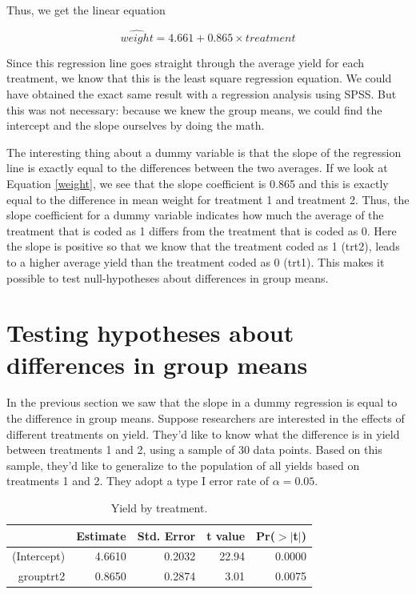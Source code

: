 \documentclass[]{book}\usepackage[]{graphicx}\usepackage[]{color}
\begin{document}
Thus, we get the linear equation 

\begin{equation}
\label{weight}
\widehat{weight} = 4.661 + 0.865\times treatment
\end{equation}

Since this regression line goes straight through the average yield for each treatment, we know that this is the least square regression equation. We could have obtained the exact same result with a regression analysis using SPSS. But this was not necessary: because we knew the group means, we could find the intercept and the slope ourselves by doing the math.  

The interesting thing about a dummy variable is that the slope of the regression line is exactly equal to the differences between the two averages. If we look at Equation \ref{weight}, we see that the slope coefficient is 0.865 and this is exactly equal to the difference in mean weight for treatment 1 and treatment 2. Thus, the slope coefficient for a dummy variable indicates how much the average of the treatment that is coded as 1 differs from the treatment that is coded as 0. Here the slope is positive so that we know that the treatment coded as 1 (trt2), leads to a higher average yield than the treatment coded as 0 (trt1). This makes it possible to test null-hypotheses about differences in group means.

\section{Testing hypotheses about differences in group means}

In the previous section we saw that the slope in a dummy regression is equal to the difference in group means. Suppose researchers are interested in the effects of different treatments on yield. They'd like to know what the difference is in yield between treatments 1 and 2, using a sample of 30 data points. Based on this sample, they'd like to generalize to the population of all yields based on treatments 1 and 2. They adopt a type I error rate of $\alpha=0.05$.


\begin{table}[ht]
\centering
\caption{Yield by treatment.} 
\label{tab:dummy_9}
\begin{tabular}{rrrrr}
  \hline
 & Estimate & Std. Error & t value & Pr($>$$|$t$|$) \\ 
  \hline
(Intercept) & 4.6610 & 0.2032 & 22.94 & 0.0000 \\ 
  grouptrt2 & 0.8650 & 0.2874 & 3.01 & 0.0075 \\ 
   \hline
\end{tabular}
\end{table}
\end{document}

